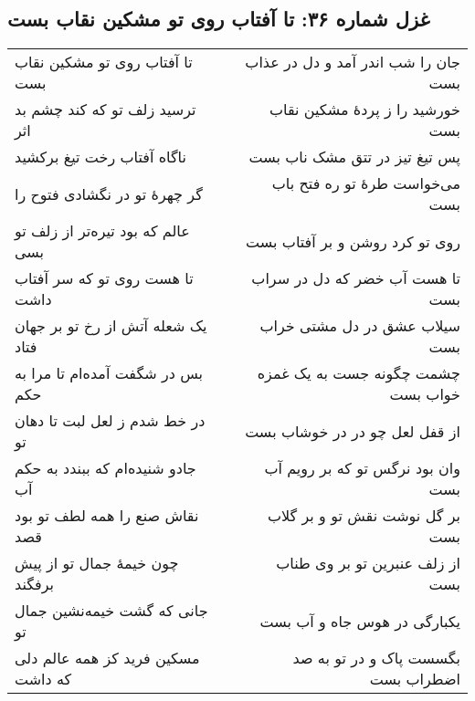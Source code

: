 \begin{center}
\section*{غزل شماره ۳۶: تا آفتاب روی تو مشکین نقاب بست}
\label{sec:036}
\begin{longtable}{l p{0.5cm} r}
تا آفتاب روی تو مشکین نقاب بست
&&
جان را شب اندر آمد و دل در عذاب بست
\\
ترسید زلف تو که کند چشم بد اثر
&&
خورشید را ز پردهٔ مشکین نقاب بست
\\
ناگاه آفتاب رخت تیغ برکشید
&&
پس تیغ تیز در تتق مشک ناب بست
\\
گر چهرهٔ تو در نگشادی فتوح را
&&
می‌خواست طرهٔ تو ره فتح باب بست
\\
عالم که بود تیره‌تر از زلف تو بسی
&&
روی تو کرد روشن و بر آفتاب بست
\\
تا هست روی تو که سر آفتاب داشت
&&
تا هست آب خضر که دل در سراب بست
\\
یک شعله آتش از رخ تو بر جهان فتاد
&&
سیلاب عشق در دل مشتی خراب بست
\\
بس در شگفت آمده‌ام تا مرا به حکم
&&
چشمت چگونه جست به یک غمزه خواب بست
\\
در خط شدم ز لعل لبت تا دهان تو
&&
از قفل لعل چو در در خوشاب بست
\\
جادو شنیده‌ام که ببندد به حکم آب
&&
وان بود نرگس تو که بر رویم آب بست
\\
نقاش صنع را همه لطف تو بود قصد
&&
بر گل نوشت نقش تو و بر گلاب بست
\\
چون خیمهٔ جمال تو از پیش برفگند
&&
از زلف عنبرین تو بر وی طناب بست
\\
جانی که گشت خیمه‌نشین جمال تو
&&
یکبارگی در هوس جاه و آب بست
\\
مسکین فرید کز همه عالم دلی که داشت
&&
بگسست پاک و در تو به صد اضطراب بست
\\
\end{longtable}
\end{center}
